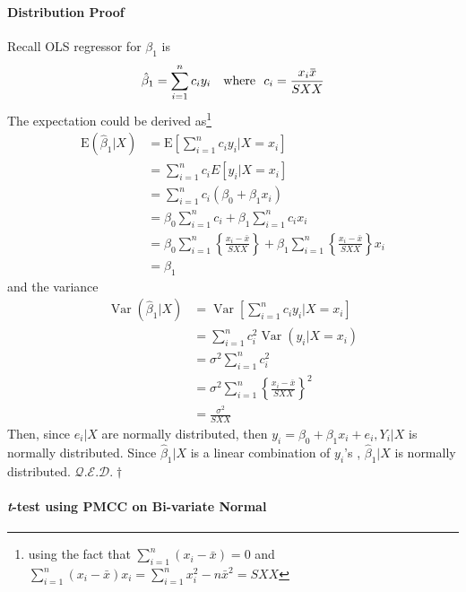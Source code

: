 \documentclass[10pt]{article}
\newcommand{\qed}{\hfill $\mathcal{Q}.\mathcal{E}.\mathcal{D}.\dagger$}
\newcommand{\overbar}[1]{\mkern 1.5mu\overline{\mkern-1.5mu#1\mkern-1.5mu}\mkern 1.5mu}
\begin{document}
\paragraph{Distribution Proof}
Recall OLS regressor for $\beta_1$ is
\begin{equation*}
    \hat{\beta}_1 = \sum_{i = 1}^n c_iy_i \quad \text{where}~~ c_i = \frac{x_i \overbar{x}}{SXX}
\end{equation*}
The expectation could be derived as\footnote{using the fact that $\sum_{i=1}^{n}\left(x_{i}-\bar{x}\right)=0$ and $\sum_{i=1}^{n}\left(x_{i}-\bar{x}\right) x_{i}=\sum_{i=1}^{n} x_{i}^{2}-n \bar{x}^{2}=S X X$}
\begin{align*}
    \mathrm{E}\left(\hat{\beta}_{1} | X\right) &=\mathrm{E}\left[\sum_{i=1}^{n} c_{i} y_{i} | X=x_{i}\right] \\ &=\sum_{i=1}^{n} c_{i} E\left[y_{i} | X=x_{i}\right] \\ &=\sum_{i=1}^{n} c_{i}\left(\beta_{0}+\beta_{1} x_{i}\right) \\ &=\beta_{0} \sum_{i=1}^{n} c_{i}+\beta_{1} \sum_{i=1}^{n} c_{i} x_{i} \\ &=\beta_{0} \sum_{i=1}^{n}\left\{\frac{x_{i}-\bar{x}}{S X X}\right\}+\beta_{1} \sum_{i=1}^{n}\left\{\frac{x_{i}-\bar{x}}{S X X}\right\} x_{i} \\ &=\beta_{1} 
\end{align*}
and the variance
\begin{align*}
    \operatorname{Var}\left(\hat{\beta}_{1} | X\right) &=\operatorname{Var}\left[\sum_{i=1}^{n} c_{i} y_{i} | X=x_{i}\right] \\ &=\sum_{i=1}^{n} c_{i}^{2} \operatorname{Var}\left(y_{i} | X=x_{i}\right) \\ &=\sigma^{2} \sum_{i=1}^{n} c_{i}^{2} \\ &=\sigma^{2} \sum_{i=1}^{n}\left\{\frac{x_{i}-\bar{x}}{S X X}\right\}^{2} \\ &=\frac{\sigma^{2}}{S X X}
\end{align*}
Then, since $e_i |X$ are normally distributed, then $y_i = \beta_{0}+\beta_{1} x_{i}+e_{i}, Y_{i} | X$ is normally distributed. Since $\hat{\beta}_{1} | X$ is a linear combination of $y_i$'s , $\hat{\beta}_1 | X$ is normally distributed. \qed


\paragraph{\color{Thistle} \textit{t}-test using PMCC on Bi-variate Normal \color{Black}}
\end{document}
